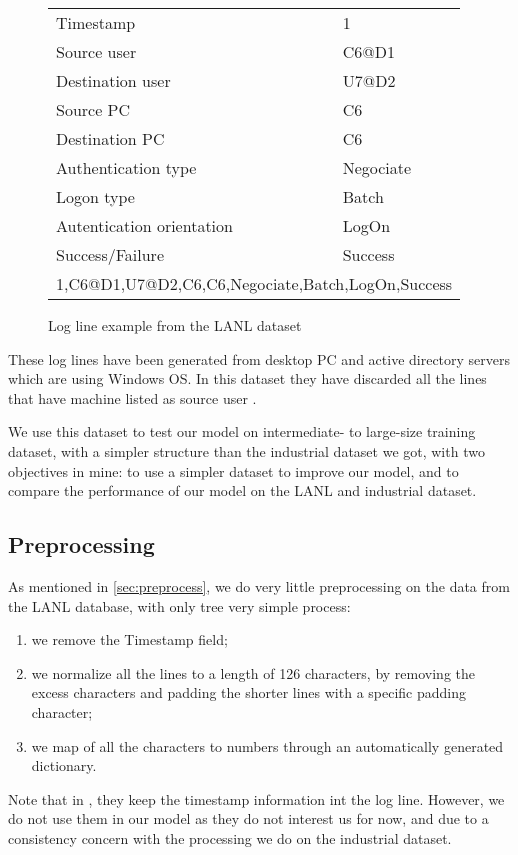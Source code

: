 \begin{figure}[!h]
\begin{center}

\begin{tabularx}{.9\textwidth}{|X|X|}
	\hline 
	Timestamp & 1\\
	Source user &C6@D1\\
	Destination user &U7@D2\\
	Source PC&C6\\
	Destination PC&C6\\
	Authentication type&Negociate\\
	Logon type&Batch\\
	Autentication orientation&LogOn\\
	Success/Failure& Success\\ 
	\hline 
	\multicolumn{2}{|c|}{1,C6@D1,U7@D2,C6,C6,Negociate,Batch,LogOn,Success} \\ 
	\hline 
\end{tabularx} 
\end{center}
\caption{Log line example from the LANL dataset \cite{rnn_attention_lanl}\label{tab:lanl}}
\end{figure} 
These log lines have been generated from desktop PC and active directory servers which are using Windows OS. In this dataset they have discarded all the lines that have machine listed as source user \cite{rnn_attention_lanl}.

We use this dataset to test our model on intermediate- to large-size training dataset, with a simpler structure than the industrial dataset we got, with two objectives in mine: to use a simpler dataset to improve our model, and to compare the performance of our model on the LANL and industrial dataset.

\subsection{Preprocessing}
As mentioned in \autoref{sec:preprocess}, we do very little preprocessing on the data from the LANL database, with only tree very simple process:
\begin{enumerate}
	\item we remove the Timestamp field;
	\item we normalize all the lines to a length of 126 characters, by removing the excess characters and padding the shorter lines with a specific padding character;
	\item we map of all the characters to numbers through an automatically generated dictionary.
\end{enumerate}

Note that in \cite{rnn_attention_lanl}, they keep the timestamp information int the log line. However, we do not use them in our model as they do not interest us for now, and due to a consistency concern with the processing we do on the industrial dataset.
